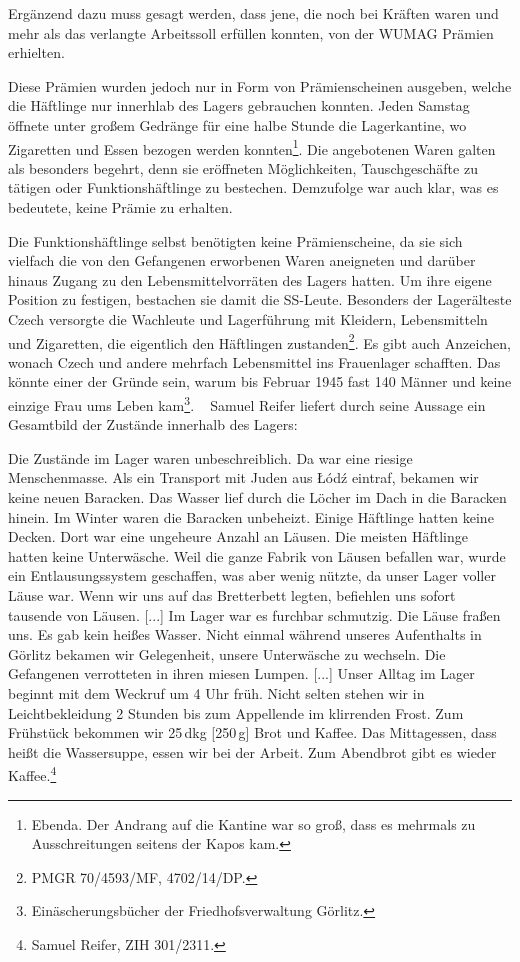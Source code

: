\documentclass[a4paper,12pt,ngerman,
]{nisebook}
\begin{document}
Ergänzend dazu muss gesagt werden, dass jene, die noch bei Kräften waren und mehr als das verlangte Arbeitssoll erfüllen konnten, von der WUMAG Prämien\label{pramien} erhielten.

Diese Prämien wurden jedoch nur in Form von Prämienscheinen ausgeben, welche die Häftlinge nur innerhlab des Lagers gebrauchen konnten. Jeden Samstag öffnete unter großem Gedränge für eine halbe Stunde die Lagerkantine, wo Zigaretten und Essen bezogen werden konnten\footnote{Ebenda. Der Andrang auf die Kantine war so groß, dass es mehrmals zu Ausschreitungen seitens der Kapos kam.}. Die angebotenen Waren galten als besonders begehrt, denn sie eröffneten Möglichkeiten, Tauschgeschäfte zu tätigen oder Funktionshäftlinge zu bestechen. Demzufolge war auch klar, was es bedeutete, keine Prämie zu erhalten.


Die Funktionshäftlinge selbst benötigten keine Prämienscheine, da sie sich vielfach die von den Gefangenen erworbenen Waren aneigneten und darüber hinaus Zugang zu den Lebensmittelvorräten des Lagers hatten. Um ihre eigene Position zu festigen, bestachen sie damit die SS-Leute. Besonders der Lagerälteste Czech versorgte die Wachleute und Lagerführung mit Kleidern, Lebensmitteln und Zigaretten, die eigentlich den Häftlingen zustanden\footnote{PMGR 70/4593/MF, 4702/14/DP.}. Es gibt auch Anzeichen, wonach Czech und andere mehrfach Lebensmittel ins Frauenlager schafften. Das könnte einer der Gründe sein, warum bis Februar 1945 fast 140 Männer und keine einzige Frau ums Leben kam\footnote{Einäscherungsbücher der Friedhofsverwaltung Görlitz.}.
~\newline
Samuel Reifer liefert durch seine Aussage ein Gesamtbild der Zustände innerhalb des Lagers:
\begin{leftbar}
Die Zustände im Lager waren unbeschreiblich. Da war eine riesige Menschenmasse. Als ein Transport mit Juden aus \L \'od\'z eintraf, bekamen wir keine neuen Baracken. Das Wasser lief durch die Löcher im Dach in die Baracken hinein. Im Winter waren die Baracken unbeheizt. Einige Häftlinge hatten keine Decken. Dort war eine ungeheure Anzahl an Läusen. Die meisten Häftlinge hatten keine Unterwäsche. Weil die ganze Fabrik von Läusen befallen war, wurde ein Entlausungssystem geschaffen, was aber wenig nützte, da unser Lager voller Läuse war. Wenn wir uns auf das Bretterbett legten, befiehlen uns sofort tausende von Läusen.
[...]
Im Lager war es furchbar schmutzig. Die Läuse fraßen uns. Es gab kein heißes Wasser. Nicht einmal während unseres Aufenthalts in Görlitz bekamen wir Gelegenheit, unsere Unterwäsche zu wechseln. Die Gefangenen verrotteten in ihren miesen Lumpen.
[...] \newline
Unser Alltag im Lager beginnt mit dem Weckruf um 4 Uhr früh. Nicht selten stehen wir in Leichtbekleidung 2 Stunden bis zum Appellende im klirrenden Frost. Zum Frühstück bekommen wir 25\,dkg [250\,g] Brot und Kaffee. Das Mittagessen, dass heißt die Wassersuppe, essen wir bei der Arbeit.
Zum Abendbrot gibt es wieder Kaffee.\footnote{Samuel Reifer, ZIH 301/2311.}
\end{leftbar}
\end{document}
